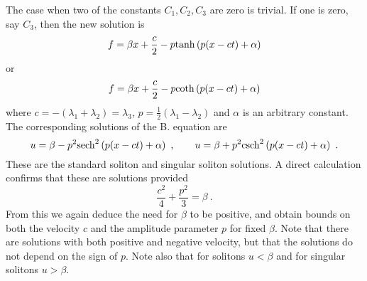 \documentclass[12pt]{article}
\begin{document}

The case when two of the constants $C_1,C_2,C_3$ are zero is trivial. If one is zero, say $C_3$, then the new
solution is  
$$
f =  \beta x + \frac{c}{2}-  p {\rm tanh}\left( p(x-ct) + \alpha \right) 
$$  
or 
$$
  f =  \beta x + \frac{c}{2}  -  p {\rm coth}\left( p(x-ct) + \alpha \right)  
$$
where $c = -(\lambda_1+\lambda_2)=\lambda_3$, $p=\frac12(\lambda_1-\lambda_2)$ and $\alpha$ is an
arbitrary constant. The corresponding solutions of the B. equation are 
$$
u =  \beta -  p^2 {\rm sech}^2\left( p(x-ct) + \alpha \right) \ ,\qquad 
u =  \beta +  p^2 {\rm csch}^2\left( p(x-ct) + \alpha \right) \ . 
$$  
These are the standard soliton and singular soliton solutions. 
A direct calculation confirms that these are solutions provided
\begin{equation}   \frac{c^2}{4} + \frac{p^2}{3} = \beta\ .   \label{speedamp} \end{equation} 
From this we again deduce the need for $\beta$ to be positive, and obtain bounds on both the velocity $c$ and the
amplitude parameter $p$ for fixed $\beta$.  Note that there are solutions with both positive and negative
velocity, but that the solutions do not depend on the sign of $p$. Note also that for solitons $u<\beta$ and for singular
solitons $u>\beta$. 
\end{document}
